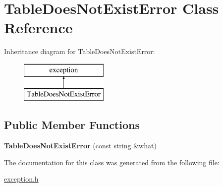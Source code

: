 \hypertarget{class_table_does_not_exist_error}{\section{Table\-Does\-Not\-Exist\-Error Class Reference}
\label{class_table_does_not_exist_error}
}
Inheritance diagram for Table\-Does\-Not\-Exist\-Error\-:\begin{figure}[H]
\begin{center}
\leavevmode
\includegraphics[height=2.000000cm]{class_table_does_not_exist_error}
\end{center}
\end{figure}
\subsection*{Public Member Functions}
\begin{DoxyCompactItemize}
\item 
\hypertarget{class_table_does_not_exist_error_a2e350ef61eb9d5fc3449cbc04155aad7}{{\bfseries Table\-Does\-Not\-Exist\-Error} (const string \&what)}\label{class_table_does_not_exist_error_a2e350ef61eb9d5fc3449cbc04155aad7}

\end{DoxyCompactItemize}


The documentation for this class was generated from the following file\-:\begin{DoxyCompactItemize}
\item 
\hyperlink{exception_8h}{exception.\-h}\end{DoxyCompactItemize}
